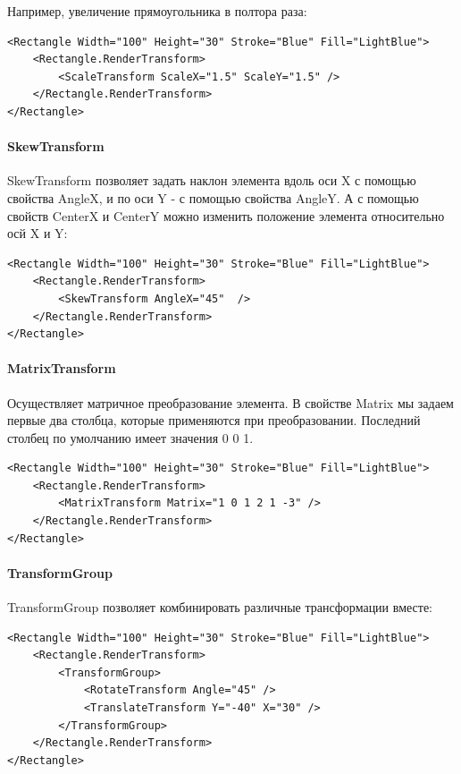 Например, увеличение прямоугольника в полтора раза:

\begin{verbatim}
<Rectangle Width="100" Height="30" Stroke="Blue" Fill="LightBlue">
    <Rectangle.RenderTransform>
        <ScaleTransform ScaleX="1.5" ScaleY="1.5" />
    </Rectangle.RenderTransform>
</Rectangle>
\end{verbatim}

\paragraph{SkewTransform}
SkewTransform позволяет задать наклон элемента вдоль оси X с помощью свойства AngleX, и по оси Y - с помощью свойства AngleY. А с помощью свойств CenterX и CenterY можно изменить положение элемента относительно осй X и Y:

\begin{verbatim}
<Rectangle Width="100" Height="30" Stroke="Blue" Fill="LightBlue">
    <Rectangle.RenderTransform>
        <SkewTransform AngleX="45"  />
    </Rectangle.RenderTransform>
</Rectangle>
\end{verbatim}

\paragraph{MatrixTransform}
Осуществляет матричное преобразование элемента. В свойстве Matrix мы задаем первые два столбца, которые применяются при преобразовании. Последний столбец по умолчанию имеет значения {0 0 1}.

\begin{verbatim}
<Rectangle Width="100" Height="30" Stroke="Blue" Fill="LightBlue">
    <Rectangle.RenderTransform>
        <MatrixTransform Matrix="1 0 1 2 1 -3" />
    </Rectangle.RenderTransform>
</Rectangle>
\end{verbatim}

\paragraph{TransformGroup}
TransformGroup позволяет комбинировать различные трансформации вместе:

\begin{verbatim}
<Rectangle Width="100" Height="30" Stroke="Blue" Fill="LightBlue">
    <Rectangle.RenderTransform>
        <TransformGroup>
            <RotateTransform Angle="45" />
            <TranslateTransform Y="-40" X="30" />
        </TransformGroup>
    </Rectangle.RenderTransform>
</Rectangle>
\end{verbatim}

